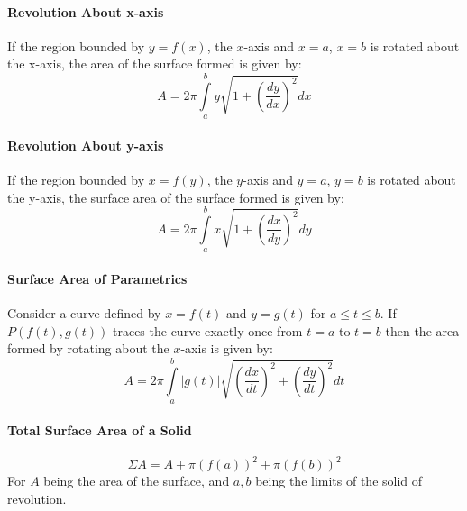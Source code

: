 \documentclass[a4paper,twoside,10pt]{article}
\begin{document}
			\paragraph{Revolution About x-axis} If the region bounded by $y=f(x)$, the $x$-axis and $x=a$, $x=b$ is rotated about the x-axis, the area of the surface formed is given by:
			\[
				A=2\pi\int\limits_a^by\sqrt{1+\left(\frac{dy}{dx}\right)^2}dx
			\]
			
			\paragraph{Revolution About y-axis} If the region bounded by $x=f(y)$, the $y$-axis and $y=a$, $y=b$ is rotated about the y-axis, the surface area of the surface formed is given by:
			\[
				A=2\pi\int\limits_a^bx\sqrt{1+\left(\frac{dx}{dy}\right)^2}dy
			\]
			
			\paragraph{Surface Area of Parametrics} Consider a curve defined by $x=f(t)$ and $y=g(t)$ for $a\leq t\leq b$. If $P(f(t),g(t))$ traces the curve exactly once from $t=a$ to $t=b$ then the area formed by rotating about the $x$-axis is given by:
			\[
				A=2\pi\int\limits_a^b|g(t)|\sqrt{\left(\frac{dx}{dt}\right)^2+\left(\frac{dy}{dt}\right)^2}dt
			\]
			
			\paragraph{Total Surface Area of a Solid}
			\[
				\Sigma A=A+\pi\left(f(a)\right)^2+\pi\left(f(b)\right)^2
			\]
			For $A$ being the area of the surface, and $a,b$ being the limits of the solid of revolution.
\end{document}
